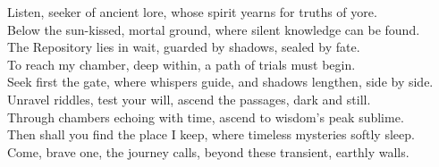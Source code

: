 \documentclass{article}
\begin{document}
\begin{infobox}
Listen, seeker of ancient lore, whose spirit yearns for truths of yore.\\
Below the sun-kissed, mortal ground, where silent knowledge can be found.\\
The Repository lies in wait, guarded by shadows, sealed by fate.\\
To reach my chamber, deep within, a path of trials must begin.\\
Seek first the gate, where whispers guide, and shadows lengthen, side by side.\\
Unravel riddles, test your will, ascend the passages, dark and still.\\
Through chambers echoing with time, ascend to wisdom's peak sublime.\\
Then shall you find the place I keep, where timeless mysteries softly sleep.\\
Come, brave one, the journey calls, beyond these transient, earthly walls.
\end{infobox}
\end{document}
